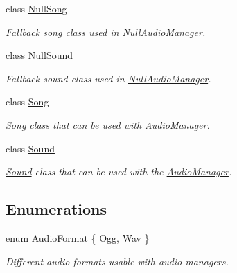 \begin{DoxyCompactItemize}
class \hyperlink{class_tri_devs_1_1_tri_engine_1_1_audio_1_1_null_song}{Null\-Song}
\begin{DoxyCompactList}\small\item\em Fallback song class used in \hyperlink{class_tri_devs_1_1_tri_engine_1_1_audio_1_1_null_audio_manager}{Null\-Audio\-Manager}. \end{DoxyCompactList}\item 
class \hyperlink{class_tri_devs_1_1_tri_engine_1_1_audio_1_1_null_sound}{Null\-Sound}
\begin{DoxyCompactList}\small\item\em Fallback sound class used in \hyperlink{class_tri_devs_1_1_tri_engine_1_1_audio_1_1_null_audio_manager}{Null\-Audio\-Manager}. \end{DoxyCompactList}\item 
class \hyperlink{class_tri_devs_1_1_tri_engine_1_1_audio_1_1_song}{Song}
\begin{DoxyCompactList}\small\item\em \hyperlink{class_tri_devs_1_1_tri_engine_1_1_audio_1_1_song}{Song} class that can be used with \hyperlink{class_tri_devs_1_1_tri_engine_1_1_audio_1_1_audio_manager}{Audio\-Manager}. \end{DoxyCompactList}\item 
class \hyperlink{class_tri_devs_1_1_tri_engine_1_1_audio_1_1_sound}{Sound}
\begin{DoxyCompactList}\small\item\em \hyperlink{class_tri_devs_1_1_tri_engine_1_1_audio_1_1_sound}{Sound} class that can be used with the \hyperlink{class_tri_devs_1_1_tri_engine_1_1_audio_1_1_audio_manager}{Audio\-Manager}. \end{DoxyCompactList}\end{DoxyCompactItemize}
\subsection*{Enumerations}
\begin{DoxyCompactItemize}
\item 
enum \hyperlink{namespace_tri_devs_1_1_tri_engine_1_1_audio_a3e1817498a8306afd084903a967537ef}{Audio\-Format} \{ \hyperlink{namespace_tri_devs_1_1_tri_engine_1_1_audio_a3e1817498a8306afd084903a967537efa7a99342f8dcbdacd3ed66edf2add143d}{Ogg}, 
\hyperlink{namespace_tri_devs_1_1_tri_engine_1_1_audio_a3e1817498a8306afd084903a967537efa0bc5cdc666c1935c50d8ece1b53edbc4}{Wav}
 \}
\begin{DoxyCompactList}\small\item\em Different audio formats usable with audio managers. \end{DoxyCompactList}\end{DoxyCompactItemize}


